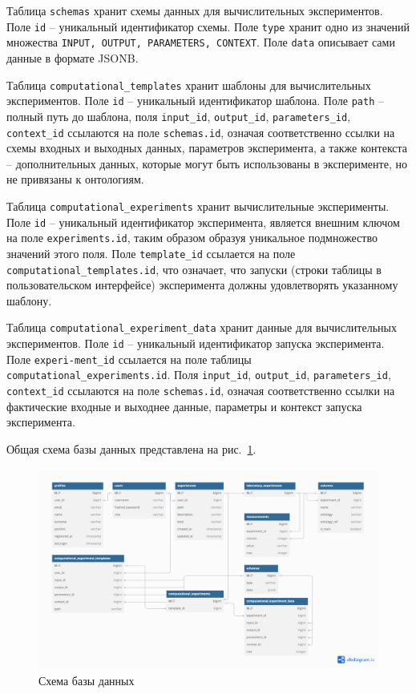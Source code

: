 Таблица \texttt{schemas} хранит схемы данных для вычислительных экспериментов.
Поле \texttt{id} -- уникальный идентификатор схемы.
Поле \texttt{type} хранит одно из значений множества \texttt{{INPUT, OUTPUT, PARAMETERS, CONTEXT}}.
Поле \texttt{data} описывает сами данные в формате JSONB.

Таблица \texttt{computational\_templates} хранит шаблоны для вычислительных экспериментов.
Поле \texttt{id} -- уникальный идентификатор шаблона. Поле \texttt{path} -- полный путь до шаблона, поля \texttt{input\_id}, \texttt{output\_id}, \texttt{parameters\_id}, \texttt{context\_id} ссылаются на поле \texttt{schemas.id}, означая соответственно ссылки на схемы входных и выходных данных, параметров эксперимента, а также контекста -- дополнительных данных, которые могут быть использованы в эксперименте, но не привязаны к онтологиям.

Таблица \texttt{computational\_experiments} хранит вычислительные эксперименты.
Поле \texttt{id} -- уникальный идентификатор эксперимента, является внешним ключом на поле \texttt{experiments.id}, таким образом образуя уникальное подмножество значений этого поля.
Поле \texttt{template\_id} ссылается на поле \texttt{computational\_templates.id}, что означает, что запуски (строки таблицы в пользовательском интерфейсе) эксперимента должны удовлетворять указанному шаблону.

Таблица \texttt{computational\_experiment\_data} хранит данные для вычислительных экспериментов.
Поле \texttt{id} -- уникальный идентификатор запуска эксперимента.
Поле \texttt{experi-\allowbreak ment\_id} ссылается на поле таблицы \texttt{computational\_experiments.id}.
Поля \texttt{input\_id}, \texttt{output\_id}, \texttt{parameters\_id}, \texttt{context\_id} ссылаются на поле \texttt{schemas.id}, означая соответственно ссылки на фактические входные и выходнее данные, параметры и контекст запуска эксперимента.


Общая схема базы данных представлена на рис.~\ref{pic:db}.

\begin{figure}[H]
    \centering
    \includegraphics[width=\linewidth]{VKR/img/database_scheme.png}
    \caption{Схема базы данных}
    \label{pic:db}
\end{figure}

